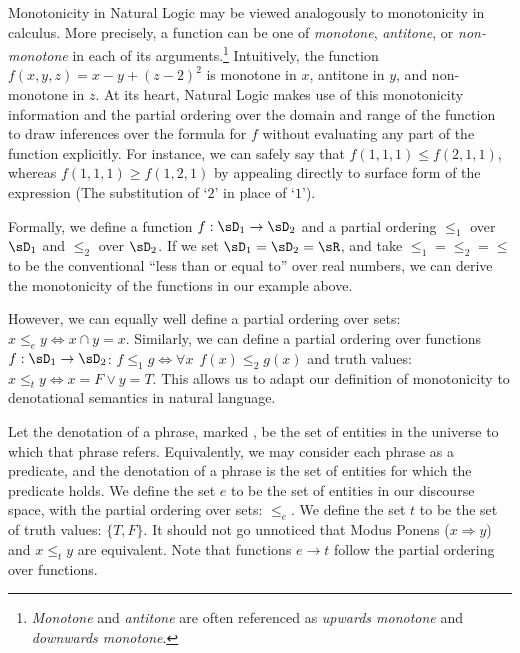 %
%
Monotonicity in Natural Logic may be viewed analogously to monotonicity
  in calculus.
More precisely, a function can be one of \textit{monotone},
  \textit{antitone}, or \textit{non-monotone} in each of its
  arguments.\footnote{
    \textit{Monotone} and \textit{antitone} are often referenced
    as \textit{upwards monotone} and \textit{downwards monotone}.
  }
Intuitively, the function $f(x,y,z) = x - y + (z-2)^2$ is
  monotone in $x$, antitone in $y$, and non-monotone in $z$.
At its heart, Natural Logic makes use of this monotonicity information
  and the partial ordering over the domain and range of the function
  to draw inferences over the formula for $f$ without evaluating
  any part of the function explicitly.
For instance, we can safely say that $f(1,1,1) \leq f(2,1,1)$, whereas
  $f(1,1,1) \geq f(1,2,1)$ by appealing directly to surface form of
  the expression (The substitution of `$2$' in place of `$1$').

Formally, we define a function $f:\sD_1 \rightarrow \sD_2$ and a partial
  ordering $\le_1$ over $\sD_1$ and $\le_2$ over $\sD_2$.
If we set $\sD_1 = \sD_2 = \sR$, and take $\le_1 = \le_2 = \le$ to be
  the conventional ``less than or equal to'' over real numbers,
  we can derive the monotonicity of the functions in our example above.

However, we can equally well define a partial ordering over sets:
  $x \le_e y \Leftrightarrow x \cap y = x$.
Similarly, we can define a partial ordering over functions
  $f : \sD_1 \rightarrow \sD_2$:
  $f \le_1 g \Leftrightarrow \forall x ~~ f(x) \leq_2 g(x)$
  and truth values:
  $x \le_t y \Leftrightarrow x = F \lor y = T$.
This allows us to adapt our definition of monotonicity to denotational
  semantics in natural language.

Let the denotation of a phrase, marked \denote{\cdot}, be the set of
  entities in the universe to which that phrase refers.
Equivalently, we may consider each phrase as a predicate, and the denotation
  of a phrase is the set of entities for which the predicate holds.
We define the set $e$ to be the set of entities in our discourse space,
  with the partial ordering over sets: $\le_e$.
We define the set $t$ to be the set of truth values: $\{T, F\}$.
It should not go unnoticed that Modus Ponens ($x \Rightarrow y$)
  and $x \le_t y$ are equivalent.
Note that functions $e \rightarrow t$ follow the partial ordering over
  functions.

